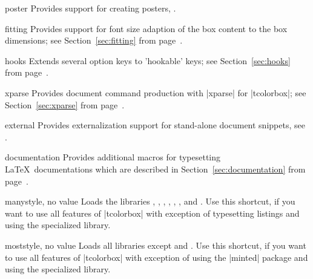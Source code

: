 {\begin{docTcbKey}[library]{poster}{}{}
  Provides support for creating posters, .
\end{docTcbKey}

\begin{docTcbKey}[library]{fitting}{}{}
  Provides support for font size adaption of the box content to
  the box dimensions;
  see Section~\ref{sec:fitting} from page~\pageref{sec:fitting}.
\end{docTcbKey}

\begin{docTcbKey}[library]{hooks}{}{}
  Extends several option keys to 'hookable' keys;
  see Section~\ref{sec:hooks} from page~\pageref{sec:hooks}.
\end{docTcbKey}

\clearpage
\begin{docTcbKey}[library]{xparse}{}{}
  Provides document command production with |xparse| for |tcolorbox|;
  see Section~\ref{sec:xparse} from page~\pageref{sec:xparse}.
\end{docTcbKey}

\begin{docTcbKey}[library]{external}{}{}
  Provides externalization support for stand-alone document snippets,
  see .
\end{docTcbKey}

\begin{docTcbKey}[library]{documentation}{}{}
  Provides additional
  macros for typesetting \LaTeX\ documentations
  which are described in Section~\ref{sec:documentation}
  from page~\pageref{sec:documentation}.
\end{docTcbKey}

\begin{docTcbKey}[library]{many}{}{style, no value}
  Loads the libraries , , , ,
  , , and .
  Use this shortcut, if you want to use all features of |tcolorbox|
  with exception of typesetting listings and using
  the specialized  library.
\end{docTcbKey}

\begin{docTcbKey}[library]{most}{}{style, no value}
  Loads all libraries except  and .
  Use this shortcut, if you want to use all features of |tcolorbox|
  with exception of using the |minted| package and using
  the specialized  library.
\end{docTcbKey}

}
